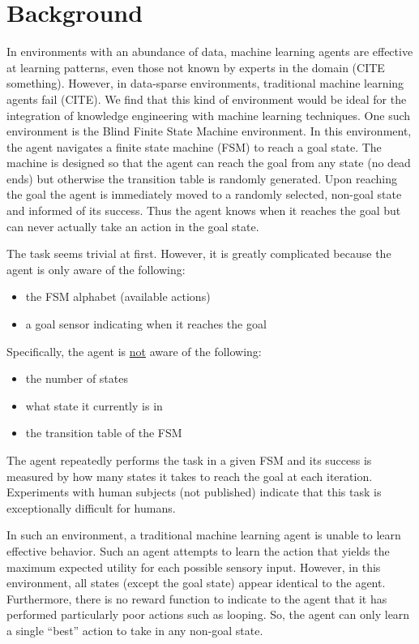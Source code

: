 \documentclass[letterpaper]{article} %
\begin{document}
\section{Background}
In environments with an abundance of data, machine learning agents are effective at learning patterns, even those not known by experts in the domain (CITE something). However, in data-sparse environments, traditional machine learning agents fail (CITE). We find that this kind of environment would be ideal for the integration of knowledge engineering with machine learning techniques. One such environment is the Blind Finite State Machine
environment.  In this environment, the agent navigates a finite state
machine (FSM) \cite{Hopcroft06} to reach a goal state.  The machine is
designed so that the agent can reach the goal from any state (no dead
ends) but otherwise the transition table is randomly generated.  Upon
reaching the goal the agent is immediately moved to a randomly
selected, non-goal state and informed of its success.  Thus the agent
knows when it reaches the goal but can never actually take an action
in the goal state.

The task seems trivial at first.  However, it is greatly complicated
because the agent is only aware of the following:
\begin{itemize}
\item the FSM alphabet (available actions)
\item a goal sensor indicating when it reaches the goal
\end{itemize}

\bigskip  %

Specifically, the agent is \underline{not} aware of the following:
\begin{itemize}
\item the number of states
\item what state it currently is in
\item the transition table of the FSM
\end{itemize}

The agent repeatedly performs the task in a given FSM and its success
is measured by how many states it takes to reach the goal at each
iteration.  Experiments with human subjects (not published) indicate
that this task is exceptionally difficult for humans.

In such an environment, a traditional machine learning agent is unable
to learn effective behavior.  Such an agent attempts to learn the
action that yields the maximum expected utility for each possible
sensory input.  However, in this environment, all states (except the
goal state) appear identical to the agent. Furthermore, there is no reward function to indicate to the agent that it has performed particularly poor actions such as looping. So, the agent can only learn a single ``best'' action to take in any non-goal state.
\end{document}
